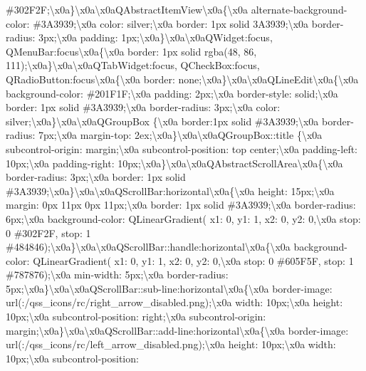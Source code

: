 \begin{DoxyCompactItemize}
\#302\+F2\+F;\textbackslash{}x0a\}\textbackslash{}x0a\textbackslash{}x0a\+Q\+Abstract\+Item\+View\textbackslash{}x0a\{\textbackslash{}x0a alternate-\/background-\/color\+: \#3\+A3939;\textbackslash{}x0a color\+: silver;\textbackslash{}x0a border\+: 1px solid 3\+A3939;\textbackslash{}x0a border-\/radius\+: 3px;\textbackslash{}x0a padding\+: 1px;\textbackslash{}x0a\}\textbackslash{}x0a\textbackslash{}x0a\+Q\+Widget\+:focus, Q\+Menu\+Bar\+:focus\textbackslash{}x0a\{\textbackslash{}x0a border\+: 1px solid rgba(48, 86, 111);\textbackslash{}x0a\}\textbackslash{}x0a\textbackslash{}x0a\+Q\+Tab\+Widget\+:focus, Q\+Check\+Box\+:focus, Q\+Radio\+Button\+:focus\textbackslash{}x0a\{\textbackslash{}x0a border\+: none;\textbackslash{}x0a\}\textbackslash{}x0a\textbackslash{}x0a\+Q\+Line\+Edit\textbackslash{}x0a\{\textbackslash{}x0a background-\/color\+: \#201\+F1\+F;\textbackslash{}x0a padding\+: 2px;\textbackslash{}x0a border-\/style\+: solid;\textbackslash{}x0a border\+: 1px solid \#3\+A3939;\textbackslash{}x0a border-\/radius\+: 3px;\textbackslash{}x0a color\+: silver;\textbackslash{}x0a\}\textbackslash{}x0a\textbackslash{}x0a\+Q\+Group\+Box \{\textbackslash{}x0a border\+:1px solid \#3\+A3939;\textbackslash{}x0a border-\/radius\+: 7px;\textbackslash{}x0a margin-\/top\+: 2ex;\textbackslash{}x0a\}\textbackslash{}x0a\textbackslash{}x0a\+Q\+Group\+Box\+::title \{\textbackslash{}x0a subcontrol-\/origin\+: margin;\textbackslash{}x0a subcontrol-\/position\+: top center;\textbackslash{}x0a padding-\/left\+: 10px;\textbackslash{}x0a padding-\/right\+: 10px;\textbackslash{}x0a\}\textbackslash{}x0a\textbackslash{}x0a\+Q\+Abstract\+Scroll\+Area\textbackslash{}x0a\{\textbackslash{}x0a border-\/radius\+: 3px;\textbackslash{}x0a border\+: 1px solid \#3\+A3939;\textbackslash{}x0a\}\textbackslash{}x0a\textbackslash{}x0a\+Q\+Scroll\+Bar\+:horizontal\textbackslash{}x0a\{\textbackslash{}x0a height\+: 15px;\textbackslash{}x0a margin\+: 0px 11px 0px 11px;\textbackslash{}x0a border\+: 1px solid \#3\+A3939;\textbackslash{}x0a border-\/radius\+: 6px;\textbackslash{}x0a background-\/color\+: Q\+Linear\+Gradient( x1\+: 0, y1\+: 1, x2\+: 0, y2\+: 0,\textbackslash{}x0a stop\+: 0 \#302\+F2\+F, stop\+: 1 \#484846);\textbackslash{}x0a\}\textbackslash{}x0a\textbackslash{}x0a\+Q\+Scroll\+Bar\+::handle\+:horizontal\textbackslash{}x0a\{\textbackslash{}x0a background-\/color\+: Q\+Linear\+Gradient( x1\+: 0, y1\+: 1, x2\+: 0, y2\+: 0,\textbackslash{}x0a stop\+: 0 \#605\+F5\+F, stop\+: 1 \#787876);\textbackslash{}x0a min-\/width\+: 5px;\textbackslash{}x0a border-\/radius\+: 5px;\textbackslash{}x0a\}\textbackslash{}x0a\textbackslash{}x0a\+Q\+Scroll\+Bar\+::sub-\/line\+:horizontal\textbackslash{}x0a\{\textbackslash{}x0a border-\/image\+: url(\+:/qss\+\_\+icons/rc/right\+\_\+arrow\+\_\+disabled.\+png);\textbackslash{}x0a width\+: 10px;\textbackslash{}x0a height\+: 10px;\textbackslash{}x0a subcontrol-\/position\+: right;\textbackslash{}x0a subcontrol-\/origin\+: margin;\textbackslash{}x0a\}\textbackslash{}x0a\textbackslash{}x0a\+Q\+Scroll\+Bar\+::add-\/line\+:horizontal\textbackslash{}x0a\{\textbackslash{}x0a border-\/image\+: url(\+:/qss\+\_\+icons/rc/left\+\_\+arrow\+\_\+disabled.\+png);\textbackslash{}x0a height\+: 10px;\textbackslash{}x0a width\+: 10px;\textbackslash{}x0a subcontrol-\/position\+: 
\end{DoxyCompactItemize}
